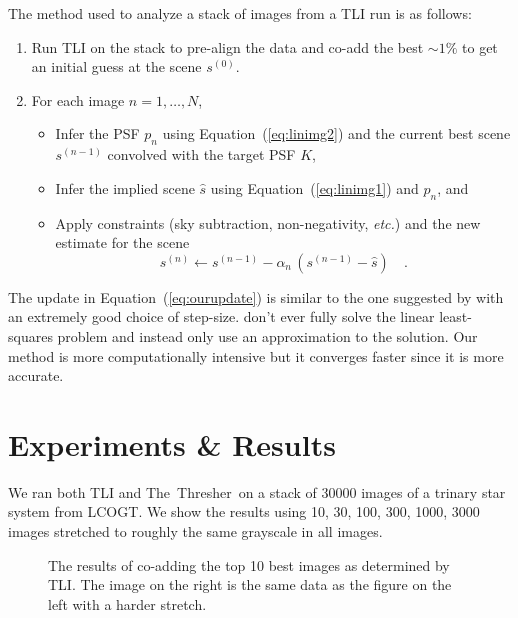 \documentclass[12pt,preprint]{aastex}
\newcommand{\project}[1]{{\sffamily #1}}
\newcommand{\TheThresher}{\project{The~Thresher}}
\newcommand{\LCOGT}{\project{LCOGT}}
\newcommand{\foreign}[1]{\emph{#1}}
\newcommand{\etc}{\foreign{etc.}}
\newcommand{\figlabel}[1]{\label{fig:#1}}
\newcommand{\Eq}[1]{Equation~(\ref{eq:#1})}
\newcommand{\eq}[1]{\Eq{#1}}
\newcommand{\eqlabel}[1]{\label{eq:#1}}
\newcommand{\kernel}{\ensuremath{K}}
\newcommand{\svec}{\ensuremath{s}}
\newcommand{\pvec}{\ensuremath{p}}
\newcommand{\dfmplot}[1]{%
\begin{center}%
\end{center}%
}
\begin{document}
The method used to analyze a stack of images from a TLI run is as follows:
\begin{enumerate}
    \item{Run TLI on the stack to pre-align the data and co-add the best
        $\sim 1\%$ to get an initial guess at the scene $\svec^{(0)}$.}
    \item{For each image $n = 1, \ldots, N$,
\begin{itemize}
    \item{Infer the PSF $\pvec_n$ using \eq{linimg2} and the current best
        scene $\svec^{(n-1)}$ convolved with the target PSF \kernel,}
    \item{Infer the implied scene $\hat{\svec}$ using \eq{linimg1} and
        $\pvec_n$, and}
    \item{Apply constraints (sky subtraction, non-negativity, \etc)
            and the new estimate for the scene
            \begin{equation}\eqlabel{ourupdate}
                \svec^{(n)} \gets \svec^{(n-1)} - \alpha_n \,
                (\svec^{(n-1)} - \hat{\svec}) \quad.
            \end{equation}
        }
\end{itemize}
        }
\end{enumerate}

The update in \eq{ourupdate} is similar to the one suggested by
\citet{hirsch} with an extremely good choice of step-size. \citet{hirsch}
don't ever fully solve the linear least-squares problem and instead only
use an approximation to the solution. Our method is more computationally
intensive but it converges faster since it is more accurate.

\section{Experiments \& Results}

We ran both TLI and \TheThresher\ on a stack of 30000 images of a
trinary star system from \LCOGT\@. We show the results using 10, 30, 100,
300, 1000, 3000 images stretched to roughly the same
grayscale in all images.

\begin{figure}[!htbp]
    \dfmplot{tli10.png}
    \caption{The results of co-adding the top 10 best images as determined
        by TLI\@. The image on the right is the same data as the figure on the
        left with a harder stretch.\figlabel{tli:10}}
\end{figure}
\end{document}
